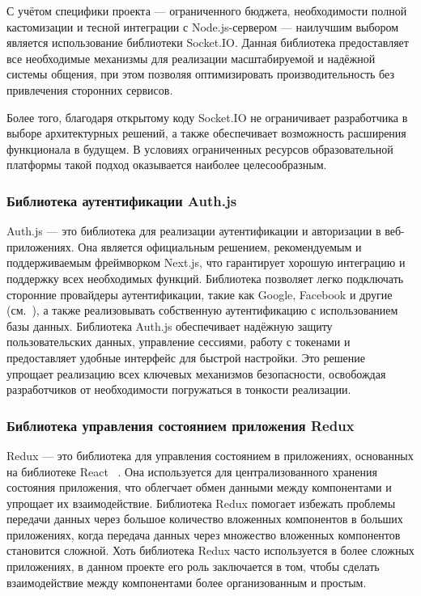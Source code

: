С учётом специфики проекта — ограниченного бюджета, необходимости полной кастомизации и тесной интеграции с Node.js-сервером — наилучшим выбором является использование библиотеки Socket.IO. Данная библиотека предоставляет все необходимые механизмы для реализации масштабируемой и надёжной системы общения, при этом позволяя оптимизировать производительность без привлечения сторонних сервисов.

Более того, благодаря открытому коду Socket.IO не ограничивает разработчика в выборе архитектурных решений, а также обеспечивает возможность расширения функционала в будущем. В условиях ограниченных ресурсов образовательной платформы такой подход оказывается наиболее целесообразным.

\subsubsection*{Библиотека аутентификации Auth.js}

Auth.js — это библиотека для реализации аутентификации и авторизации в веб-приложениях. Она является официальным решением, рекомендуемым и поддерживаемым фреймворком Next.js, что гарантирует хорошую интеграцию и поддержку всех необходимых функций. Библиотека позволяет легко подключать сторонние провайдеры аутентификации, такие как Google, Facebook и другие (см.~\cite{nextauth_docs}), а также реализовывать собственную аутентификацию с использованием базы данных. Библиотека Auth.js обеспечивает надёжную защиту пользовательских данных, управление сессиями, работу с токенами и предоставляет удобные интерфейс для быстрой настройки. Это решение упрощает реализацию всех ключевых механизмов безопасности, освобождая разработчиков от необходимости погружаться в тонкости реализации.  

\subsubsection*{Библиотека управления состоянием приложения Redux}

Redux — это библиотека для управления состоянием в приложениях, основанных на библиотеке React ~\cite{redux_docs}. Она используется для централизованного хранения состояния приложения, что облегчает обмен данными между компонентами и упрощает их взаимодействие. Библиотека Redux помогает избежать проблемы передачи данных через большое количество вложенных компонентов в больших приложениях, когда передача данных через множество вложенных компонентов становится сложной. Хоть библиотека Redux часто используется в более сложных приложениях, в данном проекте его роль заключается в том, чтобы сделать взаимодействие между компонентами более организованным и простым.

